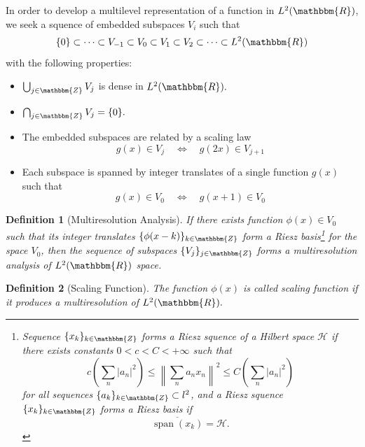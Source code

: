 \documentclass{book}
\newcommand{\tmop}[1]{\ensuremath{\operatorname{#1}}}
\newtheorem{definition}{Definition}
{\theorembodyfont{\rmfamily}\newtheorem{example}{Example}}
\begin{document}
In order to develop a multilevel representation of a function in $L^2
(\mathbbm{R})$, we seek a squence of embedded subspaces $V_i$ such that
\begin{equation}
  \{ 0 \} \subset \cdots \subset V_{- 1} \subset V_0 \subset V_1 \subset V_2
  \subset \cdots \subset L^2 (\mathbbm{R})
\end{equation}
with the following properties:
\begin{itemize}
  \item $\bigcup_{j \in \mathbbm{Z}} V_j$ is dense in $L^2 (\mathbbm{R}) .$
  
  \item $\bigcap_{j \in \mathbbm{Z}} V_j = \{ 0 \} .$
  
  \item The embedded subspaces are related by a scaling law
  \[ g (x) \in V_j \quad \Leftrightarrow \quad g (2 x) \in V_{j + 1} \]
  \item Each subspace is spanned by integer translates of a single function $g
  (x)$ such that
  \[ g (x) \in V_0 \quad \Leftrightarrow \quad g (x + 1) \in V_0 \]
\end{itemize}
\begin{definition}[Multiresolution Analysis]
  If there exists function $\phi (x) \in V_0 $ such that its integer
  translates $\{ \phi (x - k) \}_{k \in \mathbbm{Z}}$ form a Riesz
  basis\footnote{Sequence $\{ x_k \}_{k \in \mathbbm{Z}}$ forms a Riesz
  squence of a Hilbert space $\mathcal{H}$ if there exists constants $0 < c <
  C < + \infty$ such that
  \[ c \left( \sum_n | a_n |^2 \right) \leqslant \left\| \sum_n a_n x_n
     \right\|^2 \leqslant C \left( \sum_n | a_n |^2 \right) \]
  for all sequences $\{ a_k \}_{k \in \mathbbm{Z}} \subset l^2$, and a Riesz
  squence $\{ x_k \}_{k \in \mathbbm{Z}}$ forms a Riesz basis if
  \[ \overline{\tmop{span} (x_k)} =\mathcal{H}. \]
  \[ \  \]} for the space $V_0$, then the sequence of subspaces $\{ V_j \}_{j
  \in \mathbbm{Z}}$ forms a multiresolution analysis of $L^2 (\mathbbm{R})$
  space.
\end{definition}

\begin{definition}[Scaling Function]
  The function $\phi (x)$ is called scaling function if it produces a
  multiresolution of $L^2 (\mathbbm{R}) .$
\end{definition}
\end{document}
